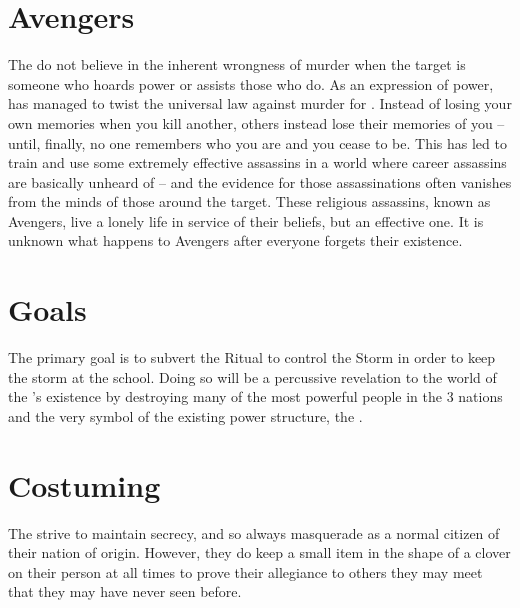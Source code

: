 \documentclass[blue]{GL2020}
\begin{document}
\section*{Avengers}
The \pGoaties{} do not believe in the inherent wrongness of murder when the target is someone who hoards power or assists those who do. As an expression of power, \cGenesis{} has managed to twist the universal law against murder for \pGoaties{}. Instead of losing your own memories when you kill another, others instead lose their memories of you -- until, finally, no one remembers who you are and you cease to be. This has led \pGoaties{} to train and use some extremely effective assassins in a world where career assassins are basically unheard of -- and the evidence for those assassinations often vanishes from the minds of those around the target. These religious assassins, known as Avengers, live a lonely life in service of their beliefs, but an effective one. It is unknown what happens to Avengers after everyone forgets their existence.

\section*{Goals}
The primary goal is to subvert the Ritual to control the Storm in order to keep the storm at the school. Doing so will be a percussive revelation to the world of the \pGoaties{}’s existence by destroying many of the most powerful people in the 3 nations and the very symbol of the existing power structure, the \pSchool{}.

\section*{Costuming}
The \pGoaties{} strive to maintain secrecy, and so always masquerade as a normal citizen of their nation of origin. However, they do keep a small item in the shape of a clover on their person at all times to prove their allegiance to others they may meet that they may have never seen before.
\end{document}
